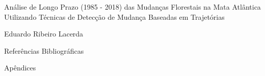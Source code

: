 \documentclass[12pt,a4paper]{article}
\begin{document}

\begin{titlepage}
    \centering
    \vspace*{\fill}

    \vspace*{0.5cm}

    \Large%
    Análise de Longo Prazo (1985 - 2018) das Mudanças Florestais na Mata Atlântica Utilizando Técnicas de Detecção de Mudança Baseadas em Trajetórias

    \vspace*{5cm}

    \large Eduardo Ribeiro Lacerda

    \vspace*{\fill}
\end{titlepage}

\newpage
\tableofcontents

\newpage
\listoffigures
\newpage


\newpage


\newpage


\newpage


\newpage

% 

\begin{titlepage}
    \centering
    \vspace*{\fill}

    \vspace*{0.5cm}

    \Large%
    Referências Bibliográficas

    \vspace*{5cm}


    \vspace*{\fill}
\end{titlepage}


%


\begin{titlepage}
    \centering
    \vspace*{\fill}

    \vspace*{0.5cm}

    \Large%
    Apêndices

    \vspace*{5cm}


    \vspace*{\fill}
\end{titlepage}

\newpage


\newpage

\end{document}
